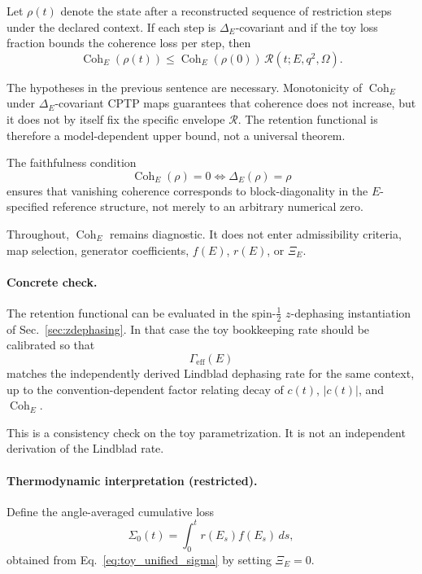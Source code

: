 \documentclass[aps,prx,onecolumn,11pt]{revtex4-2}
\theoremstyle{plain}
\theoremstyle{definition}
\theoremstyle{remark}
\newcommand{\Coh}{\operatorname{Coh}}       %
\begin{document}
Let \(\rho(t)\) denote the state after a reconstructed sequence of
restriction steps under the declared context. If each step is
\(\Delta_E\)-covariant and if the toy loss fraction bounds the
coherence loss per step, then
\begin{equation}
\Coh_E(\rho(t))
\leq
\Coh_E(\rho(0))\,\mathcal R(t;E,q^2,\Omega).
\label{eq:toy_unified_coh_bound}
\end{equation}

The hypotheses in the previous sentence are necessary. Monotonicity of
\(\Coh_E\) under \(\Delta_E\)-covariant CPTP maps guarantees that
coherence does not increase, but it does not by itself fix the
specific envelope \(\mathcal R\). The retention functional is therefore
a model-dependent upper bound, not a universal theorem.

The faithfulness condition
\[
\Coh_E(\rho)=0
\Longleftrightarrow
\Delta_E(\rho)=\rho
\]
ensures that vanishing coherence corresponds to block-diagonality in
the \(E\)-specified reference structure, not merely to an arbitrary
numerical zero.

Throughout, \(\Coh_E\) remains diagnostic. It does not enter
admissibility criteria, map selection, generator coefficients, \(f(E)\),
\(r(E)\), or \(\Xi_E\).

\paragraph{Concrete check.}

The retention functional can be evaluated in the spin-\(\tfrac12\)
\(z\)-dephasing instantiation of Sec.~\ref{sec:zdephasing}. In that
case the toy bookkeeping rate should be calibrated so that
\[
\Gamma_{\mathrm{eff}}(E)
\]
matches the independently derived Lindblad dephasing rate for the same
context, up to the convention-dependent factor relating decay of
\(c(t)\), \(|c(t)|\), and \(\Coh_E\).

This is a consistency check on the toy parametrization. It is not an
independent derivation of the Lindblad rate.

\paragraph{Thermodynamic interpretation (restricted).}

Define the angle-averaged cumulative loss
\begin{equation}
\Sigma_0(t)
=
\int_0^t r(E_s)f(E_s)\,ds,
\label{eq:toy_unified_sigma0}
\end{equation}
obtained from Eq.~\eqref{eq:toy_unified_sigma} by setting
\(\Xi_E=0\).
\end{document}
